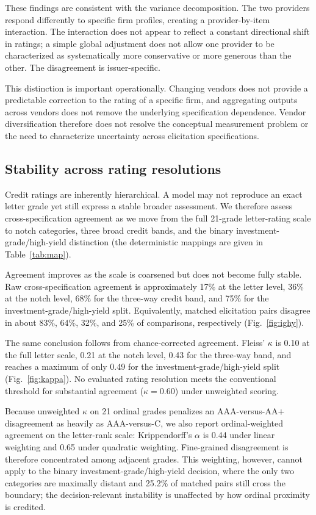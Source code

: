 \documentclass[a4paper,fleqn]{cas-sc}
\begin{document}
These findings are consistent with the variance decomposition. The two providers respond differently to
specific firm profiles, creating a provider-by-item interaction. The interaction does not appear to
reflect a constant directional shift in ratings; a simple global adjustment does not allow one provider to
be characterized as systematically more conservative or more generous than the other. The disagreement is
issuer-specific.

This distinction is important operationally. Changing vendors does not provide a predictable correction
to the rating of a specific firm, and aggregating outputs across vendors does not remove the underlying
specification dependence. Vendor diversification therefore does not resolve the conceptual measurement
problem or the need to characterize uncertainty across elicitation specifications.

\subsection{Stability across rating resolutions}
Credit ratings are inherently hierarchical. A model may not reproduce an exact letter grade yet still
express a stable broader assessment. We therefore assess cross-specification agreement as we move from
the full 21-grade letter-rating scale to notch categories, three broad credit bands, and the binary
investment-grade/high-yield distinction (the deterministic mappings are given in Table~\ref{tab:map}).

Agreement improves as the scale is coarsened but does not become fully stable. Raw cross-specification
agreement is approximately 17\% at the letter level, 36\% at the notch level, 68\% for the three-way
credit band, and 75\% for the investment-grade/high-yield split. Equivalently, matched elicitation pairs
disagree in about 83\%, 64\%, 32\%, and 25\% of comparisons, respectively (Fig.~\ref{fig:ighy}).

The same conclusion follows from chance-corrected agreement. Fleiss' $\kappa$ is 0.10 at the full letter
scale, 0.21 at the notch level, 0.43 for the three-way band, and reaches a maximum of only 0.49 for the
investment-grade/high-yield split (Fig.~\ref{fig:kappa}). No evaluated rating resolution meets the
conventional threshold for substantial agreement ($\kappa=0.60$) under unweighted scoring.

Because unweighted $\kappa$ on 21 ordinal grades penalizes an AAA-versus-AA$+$ disagreement as heavily
as AAA-versus-C, we also report ordinal-weighted agreement on the letter-rank scale: Krippendorff's
$\alpha$ is 0.44 under linear weighting and 0.65 under quadratic weighting. Fine-grained disagreement is
therefore concentrated among adjacent grades. This weighting, however, cannot apply to the binary
investment-grade/high-yield decision, where the only two categories are maximally distant and 25.2\% of
matched pairs still cross the boundary; the decision-relevant instability is unaffected by how ordinal
proximity is credited.
\end{document}
